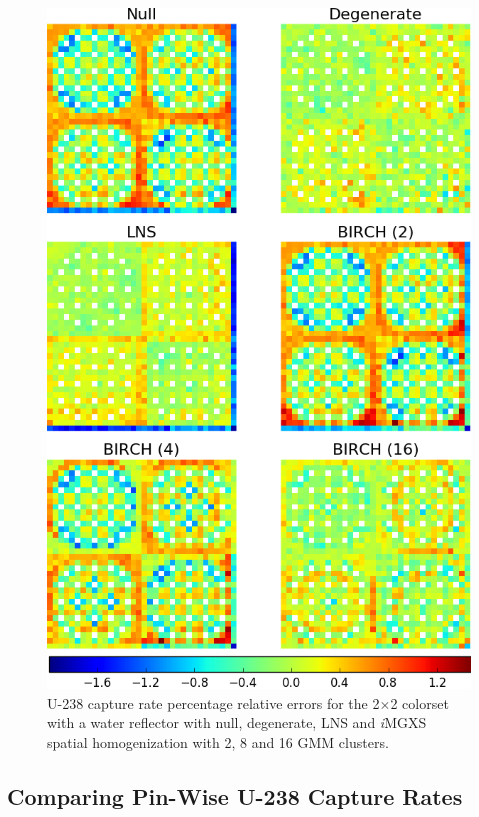 \documentclass[12pt,twoside]{mitthesis-exec}
\begin{document}
\begin{figure}[h!]
\centering
\includegraphics[width=0.83\linewidth]{figures/results/spatial/reflector/capt-err}
\vspace{2mm}
\caption[U-238 capture rate errors for the 2$\times$2 colorset with reflector]{U-238 capture rate percentage relative errors for the 2$\times$2 colorset with a water reflector with null, degenerate, LNS and \textit{i}MGXS spatial homogenization with 2, 8 and 16 GMM clusters.}
\label{fig:refl-capt-err}
\end{figure}

\clearpage

\subsection*{Comparing Pin-Wise U-238 Capture Rates}
\end{document}
